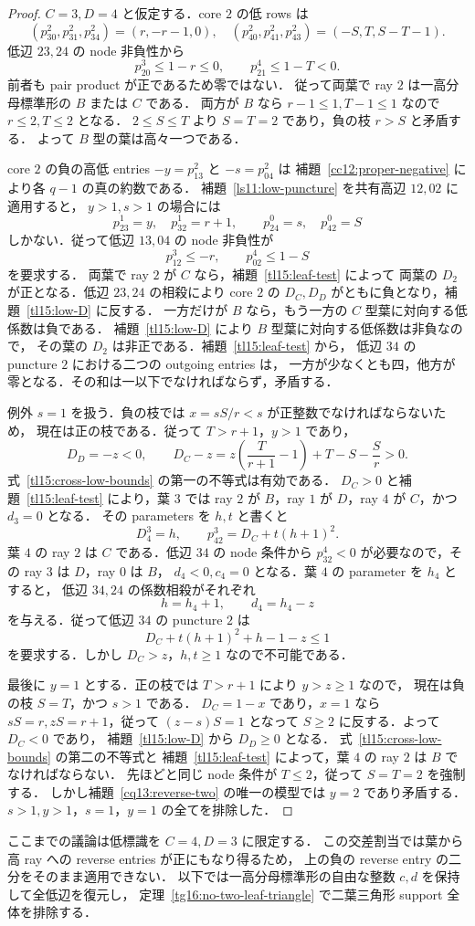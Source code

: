 \begin{proof}
$C=3,D=4$ と仮定する．core $2$ の低 rows は
\[
 (p^2_{30},p^2_{31},p^2_{34})=(r,-r-1,0),\quad
 (p^2_{40},p^2_{41},p^2_{43})=(-S,T,S-T-1).
\]
低辺 $23,24$ の node 非負性から
\[
 p^3_{20}\le1-r\le0,\qquad p^4_{21}\le1-T<0.
\]
前者も pair product が正であるため零ではない．
従って両葉で ray $2$ は一高分母標準形の $B$ または $C$ である．
両方が $B$ なら $r-1\le1,T-1\le1$ なので $r\le2,T\le2$ となる．
$2\le S\le T$ より $S=T=2$ であり，負の枝 $r>S$ と矛盾する．
よって $B$ 型の葉は高々一つである．

core $2$ の負の高低 entries $-y=p^2_{13}$ と $-s=p^2_{04}$ は
補題~\ref{cc12:proper-negative} により各 $q-1$ の真の約数である．
補題~\ref{ls11:low-puncture} を共有高辺 $12,02$ に適用すると，
$y>1,s>1$ の場合には
\[
 p^1_{23}=y,\quad p^1_{32}=r+1,\qquad
 p^0_{24}=s,\quad p^0_{42}=S
\]
しかない．従って低辺 $13,04$ の node 非負性が
\begin{equation}\label{tl15:cross-low-bounds}
 p^3_{12}\le-r,\qquad p^4_{02}\le1-S
\end{equation}
を要求する．
両葉で ray $2$ が $C$ なら，補題~\ref{tl15:leaf-test} によって
両葉の $D_2$ が正となる．低辺 $23,24$ の相殺により
core $2$ の $D_C,D_D$ がともに負となり，補題~\ref{tl15:low-D} に反する．
一方だけが $B$ なら，もう一方の $C$ 型葉に対向する低係数は負である．
補題~\ref{tl15:low-D} により $B$ 型葉に対向する低係数は非負なので，
その葉の $D_2$ は非正である．補題~\ref{tl15:leaf-test} から，
低辺 $34$ の puncture $2$ における二つの outgoing entries は，
一方が少なくとも四，他方が零となる．その和は一以下でなければならず，矛盾する．

例外 $s=1$ を扱う．負の枝では $x=sS/r<s$ が正整数でなければならないため，
現在は正の枝である．従って $T>r+1$，$y>1$ であり，
\[
 D_D=-z<0,\qquad
 D_C-z=z\left(\frac{T}{r+1}-1\right)
          +T-S-\frac Sr>0.
\]
式~\eqref{tl15:cross-low-bounds} の第一の不等式は有効である．
$D_C>0$ と補題~\ref{tl15:leaf-test} により，葉 $3$ では
ray $2$ が $B$，ray $1$ が $D$，ray $4$ が $C$，かつ $d_3=0$ となる．
その parameters を $h,t$ と書くと
\[
 D^3_4=h,\qquad p^3_{42}=D_C+t(h+1)^2.
\]
葉 $4$ の ray $2$ は $C$ である．低辺 $34$ の node 条件から
$p^4_{32}<0$ が必要なので，その ray $3$ は $D$，ray $0$ は $B$，
$d_4<0,c_4=0$ となる．葉 $4$ の parameter を $h_4$ とすると，
低辺 $34,24$ の係数相殺がそれぞれ
\[
 h=h_4+1,\qquad d_4=h_4-z
\]
を与える．従って低辺 $34$ の puncture $2$ は
\[
 D_C+t(h+1)^2+h-1-z\le1
\]
を要求する．しかし $D_C>z$，$h,t\ge1$ なので不可能である．

最後に $y=1$ とする．正の枝では $T>r+1$ により $y>z\ge1$ なので，
現在は負の枝 $S=T$，かつ $s>1$ である．
$D_C=1-x$ であり，$x=1$ なら $sS=r,zS=r+1$，従って
$(z-s)S=1$ となって $S\ge2$ に反する．よって $D_C<0$ であり，
補題~\ref{tl15:low-D} から $D_D\ge0$ となる．
式~\eqref{tl15:cross-low-bounds} の第二の不等式と
補題~\ref{tl15:leaf-test} によって，葉 $4$ の ray $2$ は $B$ でなければならない．
先ほどと同じ node 条件が $T\le2$，従って $S=T=2$ を強制する．
しかし補題~\ref{cq13:reverse-two} の唯一の模型では $y=2$ であり矛盾する．
$s>1,y>1$，$s=1$，$y=1$ の全てを排除した．
\end{proof}

ここまでの議論は低標識を $C=4,D=3$ に限定する．
この交差割当では葉から高 ray への reverse entries が正にもなり得るため，
上の負の reverse entry の二分をそのまま適用できない．
以下では一高分母標準形の自由な整数 $c,d$ を保持して全低辺を復元し，
定理~\ref{tg16:no-two-leaf-triangle} で二葉三角形 support 全体を排除する．
